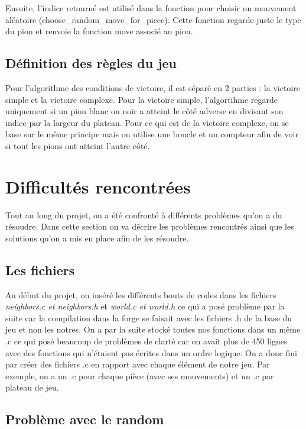 \documentclass{article}
\begin{document}
 Ensuite, l'indice retourné est utilisé dans la fonction pour choisir un mouvement aléatoire (choose\_random\_move\_for\_piece). Cette fonction regarde juste le type du pion et renvoie la fonction move associé au pion.

 \subsection{Définition des règles du jeu}

 Pour l'algorithme des conditions de victoire, il est séparé en 2 parties : la victoire simple et la victoire complexe. Pour la victoire simple, l'algortihme regarde uniquement si un pion blanc ou noir a atteint le côté adverse en divisant son indice par la largeur du plateau. Pour ce qui est de la victoire complexe, on se base sur le même principe mais on utilise une boucle et un compteur afin de voir si tout les pions ont atteint l'autre côté.


\section{Difficultés rencontrées}

Tout au long du projet, on a été confronté à différents problèmes qu'on a du résoudre. Dans cette section on va décrire les problèmes rencontrés ainsi que les solutions qu'on a mis en place afin de les résoudre.

\subsection{Les fichiers}

Au début du projet, on inséré les différents bouts de codes dans les fichiers \textit{neighbors.c et neighbors.h} et \textit{world.c et world.h} ce qui a posé problème par la suite car la compilation dans la forge se faisait avec les fichiers .h de la base du jeu et non les notres. On a par la suite stocké toutes nos fonctions dans un même .c ce qui posé beaucoup de problèmes de clarté car on avait plus de 450 lignes avec des fonctions qui n'étaient pas écrites dans un ordre logique. On a donc fini par créer des fichiers .c en rapport avec chaque élément de notre jeu. Par exemple, on a un .c pour chaque pièce (avec ses mouvements) et un .c par plateau de jeu.

\subsection{Problème avec le random}
\end{document}

